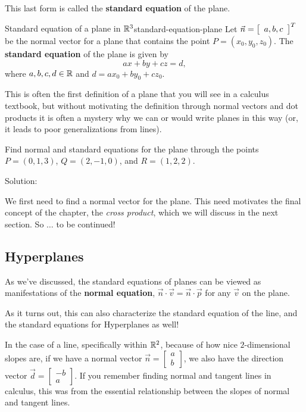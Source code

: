 \documentclass{ximera}
\begin{document}
This last form is called the \textbf{standard equation} of the plane.

\begin{definition}{Standard equation of a plane in $\R^3$}{standard-equation-plane}
  Let $\vect{n} = \startmat{c}a,b,c\stopmat^T$ be the normal vector for a plane that
  contains the point $P = (x_0, y_0, z_0)$. The \textbf{standard
    equation}%
   of the plane is given by
  \begin{equation*}
    ax + by + cz = d,
  \end{equation*}
  where $a,b,c,d \in \R$ and $d = ax_0 + by_0 + cz_0$.
\end{definition}

This is often the first definition of a plane that you will see in a calculus textbook, but without motivating the definition through normal vectors and dot products it is often a mystery why we can or would write planes in this way (or, it leads to poor generalizations from lines).

\begin{example}\label{exa:normal-from-three-points}

  Find normal and standard equations for the plane through the points
  $P = (0,1,3)$, $Q=(2,-1,0)$, and $R=(1,2,2)$.

  Solution:

  We first need to find a normal vector for the plane. This need motivates the final concept of the chapter, the \emph{cross product}, which we will discuss in the next section. So $\ldots$ to be continued!

\end{example}

\subsection*{Hyperplanes}

As we've discussed, the standard equations of planes can be viewed as manifestations of the {\bf normal equation}, $\vec{n}\cdot\vec{v}=\vec{n}\cdot\vec{p}$ for any $\vec{v}$ on the plane.

As it turns out, this can also characterize the standard equation of the line, and the standard equations for Hyperplanes as well!

In the case of a line, specifically within $\RR^2$, because of how nice $2$-dimensional slopes are, if we have a normal vector $\vec{n}=\begin{bmatrix}
  a\\b
\end{bmatrix}$, we also have the direction vector $\vec{d}=\begin{bmatrix}
  -b\\a
\end{bmatrix}$. If you remember finding normal and tangent lines in calculus, this was from the essential relationship between the slopes of normal and tangent lines.
\end{document}

